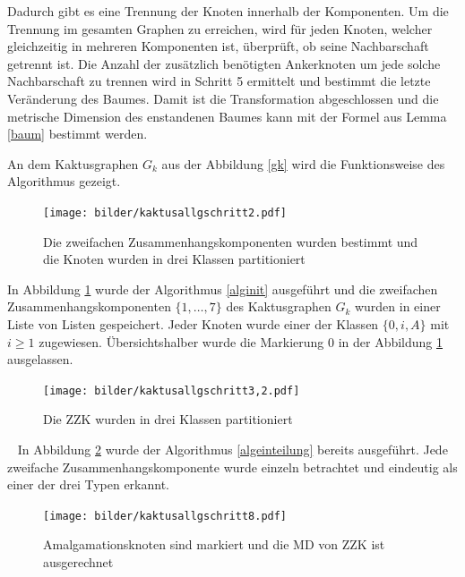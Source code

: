 Dadurch gibt es eine Trennung der Knoten innerhalb der Komponenten. Um die Trennung im gesamten Graphen zu erreichen, wird für jeden Knoten, welcher gleichzeitig in mehreren Komponenten ist, überprüft, ob seine Nachbarschaft getrennt ist. Die Anzahl der zusätzlich benötigten Ankerknoten um jede solche Nachbarschaft zu trennen wird in Schritt 5 ermittelt und bestimmt die letzte Veränderung des Baumes. Damit ist die Transformation abgeschlossen und die metrische Dimension des enstandenen Baumes kann mit der Formel aus Lemma \ref{baum} bestimmt werden.
\begin{bsp} An dem Kaktusgraphen $G_k$ aus der Abbildung \ref{gk} wird die Funktionsweise des Algorithmus gezeigt.\newline
\vspace{-3mm}
 	   	 \begin{figure}[h!]
		\centering
 		 \texttt{[image: bilder/kaktusallgschritt2.pdf]}
   \caption{Die zweifachen Zusammenhangskomponenten wurden bestimmt und die Knoten wurden in drei Klassen partitioniert}
      \label{kaktus1}
  	 \end{figure} 
\newpage
In Abbildung \ref{kaktus1} wurde der Algorithmus \ref{alginit} ausgeführt und die zweifachen Zusammenhangskomponenten $\{1, \ldots, 7\}$ des Kaktusgraphen $G_k$ wurden in einer Liste von Listen gespeichert. Jeder Knoten wurde einer der Klassen $\{0,i,A\}$ mit $i \geq 1$ zugewiesen. Übersichtshalber wurde die Markierung $0$ in der Abbildung \ref{kaktus1} ausgelassen.
\vspace{-3mm} 	   	 
 	   	 \begin{figure}[h!]
		\centering
 		 \texttt{[image: bilder/kaktusallgschritt3,2.pdf]}
   \caption{Die ZZK wurden in drei Klassen partitioniert}
      \label{kaktus1.2}
  	 \end{figure}
\vspace{-3mm}
  	 ~\linebreak
In Abbildung \ref{kaktus1.2} wurde der Algorithmus \ref{algeinteilung} bereits ausgeführt. Jede zweifache Zusammenhangskomponente wurde einzeln betrachtet und eindeutig als einer der drei Typen erkannt.\\
\vspace{-6mm}
  	   	\begin{figure}[h!]
		\centering
 		 \texttt{[image: bilder/kaktusallgschritt8.pdf]}
   \caption{Amalgamationsknoten sind markiert und die MD von ZZK ist ausgerechnet}
\label{kaktus2}  	
  	 \end{figure}
  	 \vspace{-3mm}

\end{bsp}
